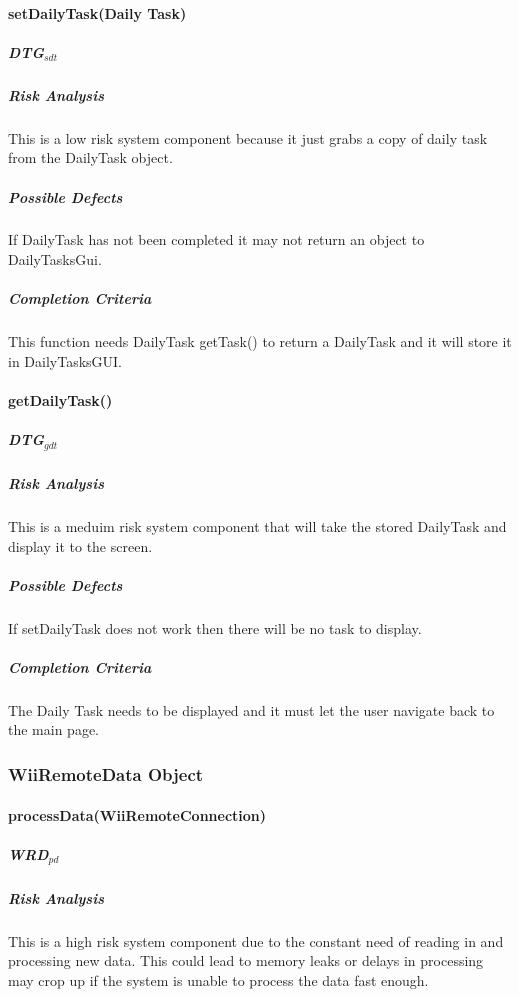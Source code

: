 \documentclass{article}
\begin{document}
\paragraph{setDailyTask(Daily Task)}

\subparagraph{DTG$_{sdt}$}

\subparagraph{Risk Analysis}
This is a low risk system component because it just grabs a copy of daily task from the DailyTask object.

\subparagraph{Possible Defects}
If DailyTask has not been completed it may not return an object to DailyTasksGui.


\subparagraph{Completion Criteria}
This function needs DailyTask getTask() to return a DailyTask and it will store it in DailyTasksGUI.



\paragraph{getDailyTask()}

\subparagraph{DTG$_{gdt}$}

\subparagraph{Risk Analysis}
This is a meduim risk system component that will take the stored DailyTask and display it to the screen.

\subparagraph{Possible Defects}
If setDailyTask does not work then there will be no task to display.

\subparagraph{Completion Criteria}
The Daily Task needs to be displayed and it must let the user navigate back to the main page.


\subsubsection{WiiRemoteData Object}

\paragraph{processData(WiiRemoteConnection)}

\subparagraph{WRD$_{pd}$}

\subparagraph{Risk Analysis}
This is a high risk system component due to the constant need of reading in and processing new data. This could lead to memory leaks or delays in processing may crop up if the system is unable to process the data fast enough.
\end{document}
